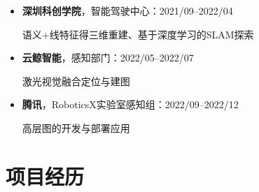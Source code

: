 \documentclass[11pt,a4paper,sans]{moderncv}        %
\begin{document}
\begin{itemize}

\item{\textbf{深圳科创学院}，智能驾驶中心：2021/09--2022/04}

语义+线特征得三维重建、基于深度学习的SLAM探索

\item{\textbf{云鲸智能}，感知部门：2022/05--2022/07}

激光视觉融合定位与建图

\item{\textbf{腾讯}，RoboticsX实验室感知组：2022/09--2022/12}

高层图的开发与部署应用

\end{itemize}


\section{项目经历}
\end{document}
